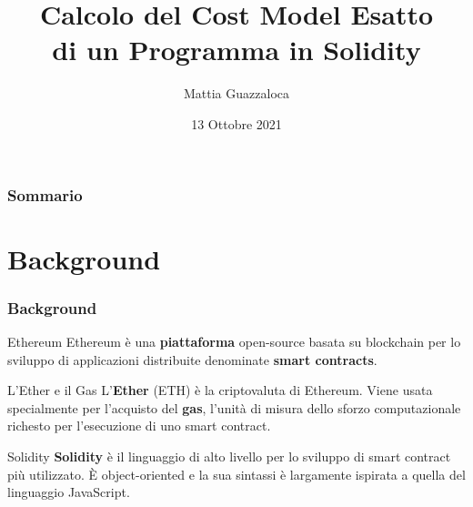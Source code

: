 \documentclass{beamer}
\title{Calcolo del Cost Model Esatto \\di un Programma in Solidity}
\author{Mattia Guazzaloca}
\institute{Alma Mater Studiorum - Università di Bologna}
\date{13 Ottobre 2021}
\begin{document}
\abovedisplayskip=0pt
\abovedisplayshortskip=0pt
\belowdisplayskip=0pt
\belowdisplayshortskip=0pt
\begin{frame}
\titlepage
\end{frame}

\begin{frame}
    \frametitle{Sommario}
    \tableofcontents
\end{frame}

\section{Background}
\begin{frame}
    \frametitle{Background}
    \begin{block}{Ethereum}
    Ethereum \`{e} una \textbf{piattaforma} open-source basata su blockchain per lo sviluppo di applicazioni distribuite denominate \textbf{smart contracts}.
    \end{block}
    \begin{block}{L'Ether e il Gas}
    L'\textbf{Ether} (ETH) \`{e} la criptovaluta di Ethereum. Viene usata specialmente per l'acquisto del \textbf{gas}, l'unit\`{a} di misura dello sforzo computazionale richesto per l'esecuzione di uno smart contract.
    \end{block}
    \begin{block}{Solidity}
    \textbf{Solidity} \`{e} il linguaggio di alto livello per lo sviluppo di smart contract pi\`{u} utilizzato. \`{E} object-oriented e la sua sintassi \`{e} largamente ispirata a quella del linguaggio JavaScript.
    \end{block}
\end{frame}
\end{document}

